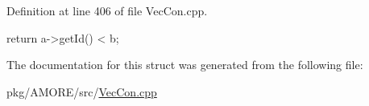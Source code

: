 Definition at line 406 of file VecCon.cpp.


\begin{DoxyCode}
  {
    return a->getId() < b;
  }
\end{DoxyCode}


The documentation for this struct was generated from the following file:\begin{DoxyCompactItemize}
\item 
pkg/AMORE/src/\hyperlink{_vec_con_8cpp}{VecCon.cpp}\end{DoxyCompactItemize}

